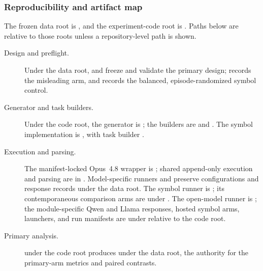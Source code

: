 \subsubsection{Reproducibility and artifact map}
The frozen data root is
,
and the experiment-code root is . Paths below are
relative to those roots unless a repository-level path is shown.
\begin{description}
  \item[Design and preflight.]
  Under the data root,  and
   freeze and validate the primary design;
   records the misleading arm,
  and  records the balanced,
  episode-randomized symbol control.

  \item[Generator and task builders.]
  Under the code root, the generator is
  ; the builders are
   and
  . The symbol implementation is
  , with task builder
  .

  \item[Execution and parsing.]
  The manifest-locked Opus~4.8 wrapper is
  ; shared
  append-only execution and parsing are in
  . Model-specific runners and
   preserve configurations
  and response records under the data root. The symbol runner is
  ; its contemporaneous comparison arms
  are under . The open-model runner
  is ; the module-specific
  Qwen and Llama responses, hosted symbol arms, launchers, and run manifests are under
   relative to the
  code root.

  \item[Primary analysis.]
   under the
  code root produces  under the data root,
  the authority for the primary-arm metrics and paired contrasts.


\end{description}
